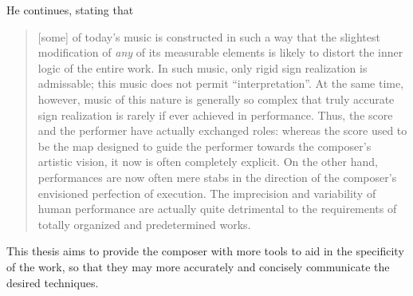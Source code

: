 He continues, stating that \begin{quotation}
    [some] of today's music is constructed in such a way that the slightest modification of \emph{any} of its measurable elements is likely to distort the inner logic of the entire work.
    In such music, only rigid sign realization is admissable; this music does not permit ``interpretation''. 
    At the same time, however, music of this nature is generally so complex that truly accurate sign realization is rarely if ever achieved in performance.
    Thus, the score and the performer have actually exchanged roles: whereas the score used to be the map designed to guide the performer towards the composer's artistic vision, it now is often completely explicit.
    On the other hand, performances are now often mere stabs in the direction of the composer's envisioned perfection of execution.
    The imprecision and variability of human performance are actually quite detrimental to the requirements of totally organized and predetermined works.\autocite[30--31]{stoneProblemsMethodsNotation1963}
\end{quotation}

This thesis aims to provide the composer with more tools to aid in the specificity of the work, so that they may more accurately and concisely communicate the desired techniques.